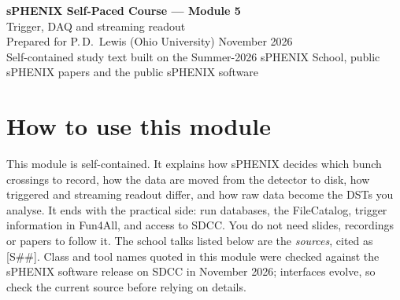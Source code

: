 \documentclass[11pt,letterpaper]{article}
\begin{document}
\begin{center}{\LARGE\bfseries sPHENIX Self-Paced Course --- Module 5}\\[4pt]
{\Large Trigger, DAQ and streaming readout}\\[8pt]
Prepared for P.\,D.\ Lewis (Ohio University) \quad November 2026\\[2pt]
\small Self-contained study text built on the Summer-2026 sPHENIX School, public sPHENIX papers and the public sPHENIX software\end{center}

\tableofcontents
\newpage

\section*{How to use this module}
This module is self-contained.
It explains how sPHENIX decides which bunch crossings to record, how the data are moved from the detector to disk, how triggered and streaming readout differ, and how raw data become the DSTs you analyse.
It ends with the practical side: run databases, the FileCatalog, trigger information in Fun4All, and access to SDCC.
You do not need slides, recordings or papers to follow it.
The school talks listed below are the \emph{sources}, cited as [S\#\#].
Class and tool names quoted in this module were checked against the sPHENIX software release on SDCC in November 2026; interfaces evolve, so check the current source before relying on details.
\end{document}
